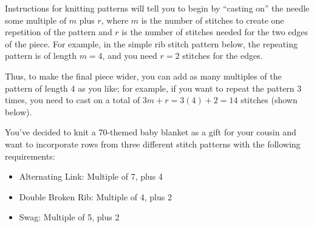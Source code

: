 \documentclass[11pt]{article}
\begin{document}
Instructions for knitting patterns will tell you to begin by ``casting
on'' the needle some multiple of $m$ plus $r$, where $m$ is the number
of stitches to create one repetition of the pattern and $r$ is the
number of stitches needed for the two edges of the piece. For example,
in the simple rib stitch pattern below, the repeating pattern is of
length $m=4$, and you need $r=2$ stitches for the edges.
\begin{center}
\end{center}
Thus, to make the final piece wider, you can add as many multiples of the pattern of length 4 as you like;
for example, if you want to repeat the pattern 3 times, you need to cast on a total of $3m+ r = 3(4) + 2 = 14$ stitches (shown below).
\begin{center}
\end{center}
You've decided to knit a 70-themed baby blanket as a gift for your cousin and
want to incorporate rows from three different stitch patterns with the
following requirements:
\begin{itemize}
\item Alternating Link: Multiple of 7, plus 4
\item Double Broken Rib: Multiple of 4, plus 2
\item Swag: Multiple of 5, plus 2
\end{itemize}
\end{document}
